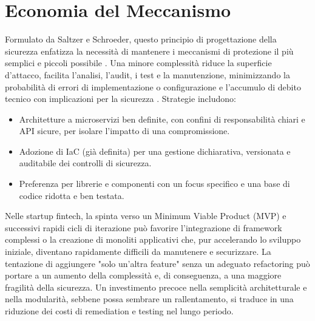 \section{Economia del Meccanismo}
Formulato da Saltzer e Schroeder, questo principio di progettazione della sicurezza enfatizza la necessità di mantenere i meccanismi di protezione il più semplici e piccoli possibile \cite{Saltzer_Schroeder_1975}. Una minore complessità riduce la superficie d'attacco, facilita l'analisi, l'audit, i test e la manutenzione, minimizzando la probabilità di errori di implementazione o configurazione e l'accumulo di debito tecnico con implicazioni per la sicurezza \cite{Smith_2012_SaltzerReview}.
Strategie includono:
\begin{itemize}
\item Architetture a microservizi ben definite, con confini di responsabilità chiari e API sicure, per isolare l'impatto di una compromissione.
\item Adozione di IaC (già definita) per una gestione dichiarativa, versionata e auditabile dei controlli di sicurezza.
\item Preferenza per librerie e componenti con un focus specifico e una base di codice ridotta e ben testata.
\end{itemize}
Nelle startup fintech, la spinta verso un Minimum Viable Product (MVP) e successivi rapidi cicli di iterazione può favorire l'integrazione di framework complessi o la creazione di monoliti applicativi che, pur accelerando lo sviluppo iniziale, diventano rapidamente difficili da manutenere e securizzare. La tentazione di aggiungere "solo un'altra feature" senza un adeguato refactoring può portare a un aumento della complessità e, di conseguenza, a una maggiore fragilità della sicurezza. Un investimento precoce nella semplicità architetturale e nella modularità, sebbene possa sembrare un rallentamento, si traduce in una riduzione dei costi di remediation e testing nel lungo periodo.
